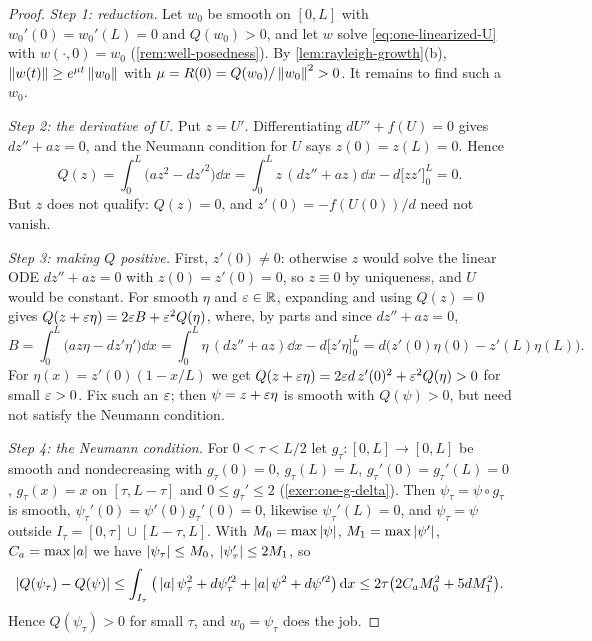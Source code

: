 \begin{proof}
\emph{Step 1: reduction.} Let $w_0$ be smooth on $[0,L]$ with $w_0'(0)=w_0'(L)=0$ and
$Q(w_0)>0$, and let $w$ solve \eqref{eq:one-linearized-U} with $w(\cdot,0)=w_0$
(\cref{rem:well-posedness}). By \cref{lem:rayleigh-growth}(b),
$\left\lVert w(t)\right\rVert\ge e^{\mu t}\left\lVert w_0\right\rVert$ with $\mu=R(0)=Q(w_0)/\left\lVert w_0\right\rVert^2>0$. It remains
to find such a $w_0$.

\emph{Step 2: the derivative of $U$.} Put $z=U'$. Differentiating $dU''+f(U)=0$ gives
$dz''+az=0$, and the Neumann condition for $U$ says $z(0)=z(L)=0$. Hence
\begin{equation*}
  Q(z) = \int_0^L\big(az^2-dz'^2\big)\dd x
  = \int_0^Lz\,(dz''+az)\dd x - d\big[zz'\big]_0^L = 0 .
\end{equation*}
But $z$ does not qualify: $Q(z)=0$, and $z'(0)=-f(U(0))/d$ need not vanish.

\emph{Step 3: making $Q$ positive.} First, $z'(0)\neq0$: otherwise $z$ would solve
the linear ODE $dz''+az=0$ with $z(0)=z'(0)=0$, so $z\equiv0$ by uniqueness, and $U$
would be constant. For smooth $\eta$ and $\varepsilon\in\mathbb{R}$, expanding and using $Q(z)=0$
gives $Q(z+\varepsilon\eta)=2\varepsilon B+\varepsilon^2Q(\eta)$, where, by parts and since $dz''+az=0$,
\begin{equation*}
  B=\int_0^L\big(az\eta-dz'\eta'\big)\dd x
  = \int_0^L\eta\,(dz''+az)\dd x - d\big[z'\eta\big]_0^L
  = d\big(z'(0)\eta(0)-z'(L)\eta(L)\big).
\end{equation*}
For $\eta(x)=z'(0)(1-x/L)$ we get $Q(z+\varepsilon\eta)=2\varepsilon d\,z'(0)^2+\varepsilon^2Q(\eta)>0$ for
small $\varepsilon>0$. Fix such an $\varepsilon$; then $\psi=z+\varepsilon\eta$ is smooth with $Q(\psi)>0$,
but need not satisfy the Neumann condition.

\emph{Step 4: the Neumann condition.} For $0<\tau<L/2$ let
$g_\tau\colon[0,L]\to[0,L]$ be smooth and nondecreasing with $g_\tau(0)=0$,
$g_\tau(L)=L$, $g_\tau'(0)=g_\tau'(L)=0$, $g_\tau(x)=x$ on $[\tau,L-\tau]$
and $0\le g_\tau'\le2$ (\cref{exer:one-g-delta}). Then $\psi_\tau=\psi\circ g_\tau$
is smooth, $\psi_\tau'(0)=\psi'(0)g_\tau'(0)=0$, likewise $\psi_\tau'(L)=0$,
and $\psi_\tau=\psi$ outside $I_\tau=[0,\tau]\cup[L-\tau,L]$. With
$M_0=\max\left\lvert \psi\right\rvert$, $M_1=\max\left\lvert \psi'\right\rvert$, $C_a=\max\left\lvert a\right\rvert$ we have
$\left\lvert \psi_\tau\right\rvert\le M_0$, $\left\lvert \psi_\tau'\right\rvert\le2M_1$, so
\begin{equation*}
  \left\lvert Q(\psi_\tau)-Q(\psi)\right\rvert
  \le \int_{I_\tau}\big(\left\lvert a\right\rvert\psi_\tau^2+d\psi_\tau'^2
      +\left\lvert a\right\rvert\psi^2+d\psi'^2\big)\,\mathrm{d} x
  \le 2\tau\big(2C_aM_0^2+5dM_1^2\big).
\end{equation*}
Hence $Q(\psi_\tau)>0$ for small $\tau$, and $w_0=\psi_\tau$ does the job.
\end{proof}


